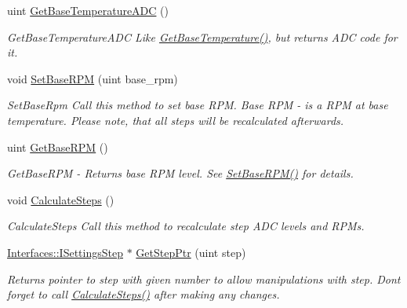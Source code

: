 \begin{DoxyCompactItemize}
uint \hyperlink{class_settings_generator_a5f3f78597f001c127b89f6447a46df09}{Get\+Base\+Temperature\+A\+DC} ()
\begin{DoxyCompactList}\small\item\em Get\+Base\+Temperature\+A\+DC Like \hyperlink{class_settings_generator_a80b1ff8060a16d149989d98a88ab253e}{Get\+Base\+Temperature()}, but returns A\+DC code for it. \end{DoxyCompactList}\item 
void \hyperlink{class_settings_generator_a1c1960b9021f7081b4c42c4d7c0eda34}{Set\+Base\+R\+PM} (uint base\+\_\+rpm)
\begin{DoxyCompactList}\small\item\em Set\+Base\+Rpm Call this method to set base R\+PM. Base R\+PM -\/ is a R\+PM at base temperature. Please note, that all steps will be recalculated afterwards. \end{DoxyCompactList}\item 
uint \hyperlink{class_settings_generator_a99bbe6e67e638ccc7bf6b21b3bc36135}{Get\+Base\+R\+PM} ()
\begin{DoxyCompactList}\small\item\em Get\+Base\+R\+PM -\/ Returns base R\+PM level. See \hyperlink{class_settings_generator_a1c1960b9021f7081b4c42c4d7c0eda34}{Set\+Base\+R\+P\+M()} for details. \end{DoxyCompactList}\item 
\mbox{\label{class_settings_generator_a7c9c1a7a3928ba3ce0ad110593b97a96}} 
void \hyperlink{class_settings_generator_a7c9c1a7a3928ba3ce0ad110593b97a96}{Calculate\+Steps} ()
\begin{DoxyCompactList}\small\item\em Calculate\+Steps Call this method to recalculate step A\+DC levels and R\+P\+Ms. \end{DoxyCompactList}\item 
\hyperlink{class_interfaces_1_1_i_settings_step}{Interfaces\+::\+I\+Settings\+Step} $\ast$ \hyperlink{class_settings_generator_a37f4175a0ed24853b2f187f15505086b}{Get\+Step\+Ptr} (uint step)
\begin{DoxyCompactList}\small\item\em Returns pointer to step with given number to allow manipulations with step. Don\textquotesingle{}t forget to call \hyperlink{class_settings_generator_a7c9c1a7a3928ba3ce0ad110593b97a96}{Calculate\+Steps()} after making any changes. \end{DoxyCompactList}\end{DoxyCompactItemize}


